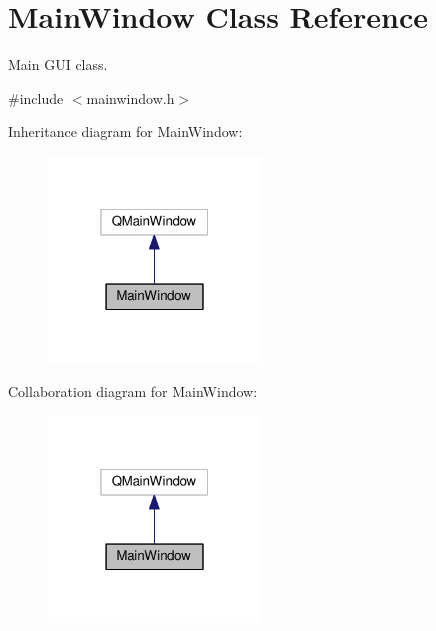 \hypertarget{classMainWindow}{\section{Main\+Window Class Reference}
\label{classMainWindow}
}


Main G\+U\+I class.  




{\ttfamily \#include $<$mainwindow.\+h$>$}



Inheritance diagram for Main\+Window\+:
\nopagebreak
\begin{figure}[H]
\begin{center}
\leavevmode
\includegraphics[width=160pt]{classMainWindow__inherit__graph}
\end{center}
\end{figure}


Collaboration diagram for Main\+Window\+:
\nopagebreak
\begin{figure}[H]
\begin{center}
\leavevmode
\includegraphics[width=160pt]{classMainWindow__coll__graph}
\end{center}
\end{figure}
